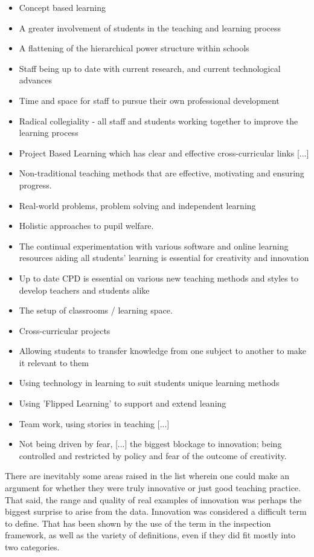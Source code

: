 \begin{itemize}
\item Concept based learning
\item A greater involvement of students in the teaching and learning process
\item A flattening of the hierarchical power structure within schools
\item Staff being up to date with current research, and current technological advances
\item Time and space for staff to pursue their own professional development
\item Radical collegiality - all staff and students working together to improve the learning process
\item Project Based Learning which has clear and effective cross-curricular links [...]
\item Non-traditional teaching methods that are effective, motivating and ensuring progress.
\item Real-world problems, problem solving and independent learning
\item Holistic approaches to pupil welfare.
\item The continual experimentation with various software and online learning resources aiding all students' learning is essential for creativity and innovation
\item Up to date CPD is essential on various new teaching methods and styles to develop teachers and students alike
\item The setup of classrooms / learning space.
\item Cross-curricular projects
\item Allowing students to transfer knowledge from one subject to another to make it relevant to them
\item Using technology in learning to suit students unique learning methods
\item Using 'Flipped Learning' to support and extend leaning
\item Team work, using stories in teaching [...]
\item Not being driven by fear, [...] the biggest blockage to innovation; being controlled and restricted by policy and fear of the outcome of creativity.
\end{itemize}

There are inevitably some areas raised in the list wherein one could make an argument for whether they were truly innovative or just good teaching practice. That said, the range and quality of real examples of innovation was perhaps the biggest surprise to arise from the data. Innovation was considered a difficult term to define. That has been shown by the use of the term in the inspection framework, as well as the variety of definitions, even if they did fit mostly into two categories. 


